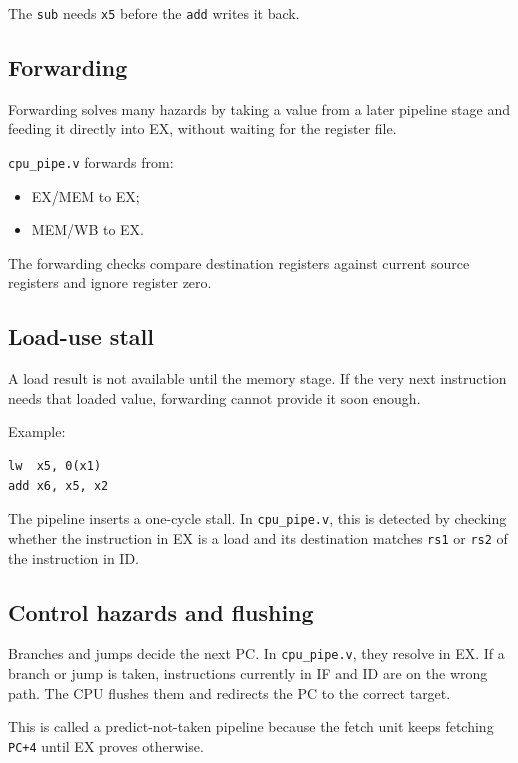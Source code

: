 The \texttt{sub} needs \texttt{x5} before the \texttt{add} writes it back.

\subsection{Forwarding}

Forwarding solves many hazards by taking a value from a later pipeline stage and feeding it directly into EX, without waiting for the register file.

\texttt{cpu\_pipe.v} forwards from:

\begin{itemize}
\item EX/MEM to EX;
\item MEM/WB to EX.
\end{itemize}
The forwarding checks compare destination registers against current source registers and ignore register zero.

\subsection{Load-use stall}

A load result is not available until the memory stage. If the very next instruction needs that loaded value, forwarding cannot provide it soon enough.

Example:

\begin{lstlisting}[language={}]
lw  x5, 0(x1)
add x6, x5, x2
\end{lstlisting}

The pipeline inserts a one-cycle stall. In \texttt{cpu\_pipe.v}, this is detected by checking whether the instruction in EX is a load and its destination matches \texttt{rs1} or \texttt{rs2} of the instruction in ID.

\subsection{Control hazards and flushing}

Branches and jumps decide the next PC. In \texttt{cpu\_pipe.v}, they resolve in EX. If a branch or jump is taken, instructions currently in IF and ID are on the wrong path. The CPU flushes them and redirects the PC to the correct target.

This is called a predict-not-taken pipeline because the fetch unit keeps fetching \texttt{PC+4} until EX proves otherwise.

\bigskip
